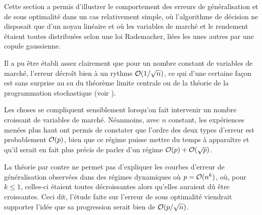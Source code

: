 Cette section a permis d'illustrer le comportement des erreurs de généralisation et de
sous optimalité dans un cas relativement simple, où l'algorithme de décision ne disposait
que d'un noyau linéaire et où les variables de marché et le rendement étaient toutes
distribuées selon une loi Rademacher, liées les unes autres par une copule gaussienne.

Il a pu être établi assez clairement que pour un nombre constant de variables de marché,
l'erreur décroît bien à un rythme $\mathcal O(1/\sqrt{n})$, ce qui d'une certaine façon est
sans surprise au su du théorème limite centrale ou de la théorie de la programmation
stochastique (voir \cite{shapiro2009lectures}).

Les choses se compliquent sensiblement lorsqu'on fait intervenir un nombre croissant de
variables de marché. Néanmoins, avec $n$ constant, les expériences menées plus haut ont
permis de constater que l'ordre des deux types d'erreur est probablement $\mathcal O(p)$, bien
que ce régime puisse mettre du temps à apparaître et qu'il serait en fait plus précis de
parler d'un régime $\mathcal O(p) + \mathcal O(\sqrt{p})$.

La théorie par contre ne permet pas d'expliquer les courbes d'erreur de généralisation
observées dans des régimes dynamiques où $p=\mathcal O(n^k)$, où, pour $k\leq1$, celles-ci étaient
toutes décroissantes alors qu'elles auraient dû être croissantes. Ceci dit, l'étude faite
sur l'erreur de sous optimalité viendrait supporter l'idée que sa progression serait bien
de $\mathcal O(p/\sqrt{n})$. 




